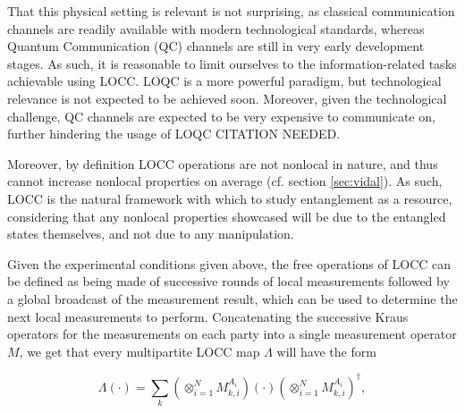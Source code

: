 That this physical setting is relevant is not surprising, as classical communication channels are readily available with modern technological standards, whereas Quantum Communication (QC) channels are still in very early development stages. As such, it is reasonable to limit ourselves to the information-related tasks achievable using LOCC. LOQC is a more powerful paradigm, but technological relevance is not expected to be achieved soon. Moreover, given the technological challenge, QC channels are expected to be very expensive to communicate on, further hindering the usage of LOQC CITATION NEEDED. 

Moreover, by definition LOCC operations are not nonlocal in nature, and thus cannot increase nonlocal properties on average (cf. section \ref{sec:vidal}). As such, LOCC is the natural framework with which to study entanglement as a resource, considering that any nonlocal properties showcased will be due to the entangled states themselves, and not due to any manipulation.

Given the experimental conditions given above, the free operations of LOCC can be defined as being made of successive rounds of local measurements followed by a global broadcast of the measurement result, which can be used to determine the next local measurements to perform. %
Concatenating the successive Kraus operators for the measurements on each party into a single measurement operator $M$, we get that every multipartite LOCC map $\Lambda$ will have the form

\begin{equation}
    \Lambda (\cdot) = \sum_{k} \left(\otimes^N_{i=1} M^{A_i}_{k, i}\right) (\cdot) \left(\otimes^N_{i=1} M^{A_i}_{k, i}\right)^\dagger, \label{eq:LOCC_map}
\end{equation}


